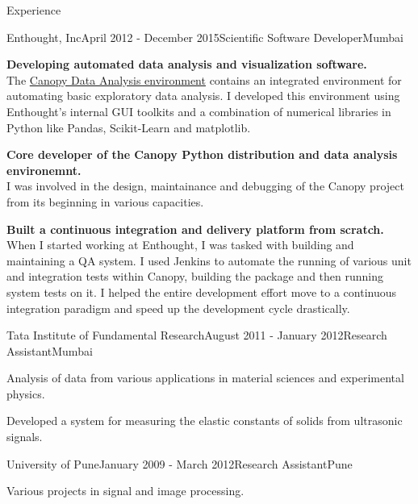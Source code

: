 \documentclass{resume} %
\begin{document}
\begin{rSection}{Experience}
\begin{rSubsection}{Enthought, Inc}{April 2012 - December 2015}{Scientific
    Software Developer}{Mumbai}
\item {\bf Developing automated data analysis and visualization software.}\\
    The \href{https://www.enthought.com/products/canopy/}{Canopy Data Analysis environment} contains an
    integrated environment for automating basic exploratory data analysis. I
    developed this environment using Enthought's internal GUI toolkits and a
    combination of numerical libraries in Python like Pandas, Scikit-Learn and
    matplotlib.
\item {\bf Core developer of the Canopy Python distribution and data analysis
    environemnt.}\\
    I was involved in the design, maintainance and debugging of the Canopy
    project from its beginning in various capacities.
\item {\bf Built a continuous integration and delivery platform from scratch.}\\
    When I started working at Enthought, I was tasked with building and
    maintaining a QA system. I used Jenkins to automate the running of various
    unit and integration tests within Canopy, building the package and then
    running system tests on it. I helped the entire development effort move to
    a continuous integration paradigm and speed up the development cycle
    drastically.
\end{rSubsection}

\begin{rSubsection}{Tata Institute of Fundamental Research}{August 2011 -
    January 2012}{Research Assistant}{Mumbai}
\item Analysis of data from various applications in material sciences and
    experimental physics.
\item Developed a system for measuring the elastic constants of solids from
    ultrasonic signals.
\end{rSubsection}

\begin{rSubsection}{University of Pune}{January 2009 - March 2012}{Research
    Assistant}{Pune}
\item Various projects in signal and image processing.
\end{rSubsection}

\end{rSection}
\end{document}
